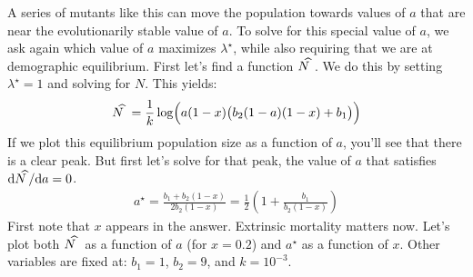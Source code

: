\documentclass[10pt,reqno]{amsbook}
\newcommand*{\xwidehat}[2]{#2\kern#1\widehat{\phantom{#2}}}
\numberwithin{equation}{chapter}
\newcommand{\mr}{\mathrm}
\begin{document}
A series of mutants like this can move the population towards values of $a$ that are near the evolutionarily stable value of $a$. To solve for this special value of $a$, we ask again which value of $a$ maximizes $\lambda^{\!\star}$, while also requiring that we are at demographic equilibrium. First let's find a function $\xwidehat{-0.57em}{N}$. We do this by setting $\lambda^{\!\star} = 1$ and solving for $N$. This yields:
\begin{align*}
	\xwidehat{-0.57em}{N} = \frac{1}{k} \log \! \Big( a (1-x) \big( b_2 (1-a) (1-x) + {b_1} \big) \Big)
\end{align*}
If we plot this equilibrium population size as a function of $a$, you'll see that there is a clear peak. But first let's solve for that peak, the value of $a$ that satisfies $\mr d \xwidehat{-0.57em}{N} \! / \mr d a = 0$.
\begin{align*}
	a^{\star} = \frac{b_1 + b_2(1-x)}{2 b_2 (1-x) } = 
				\frac{1}{2} \left( 1 + \frac{b_1}{b_2(1-x)} \right)
\end{align*}
First note that $x$ appears in the answer. Extrinsic mortality matters now. Let's plot both $\xwidehat{-0.57em}{N}$ as a function of $a$ (for $x=0.2$) and $a^{\!\star}$ as a function of $x$. Other variables are fixed at: $b_1=1$, $b_2=9$, and $k=10^{-3}$.
\end{document}
